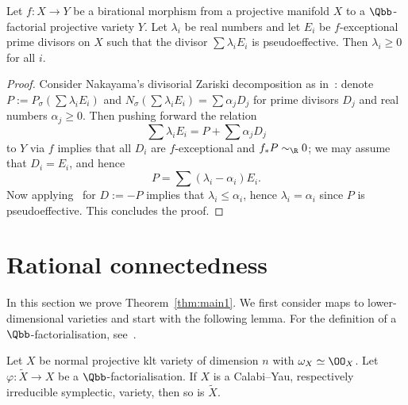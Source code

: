 \begin{lemm}\label{lem:exceptional}
Let $f\colon X\to Y$ be a birational morphism from a projective manifold $X$ to a $\Qbb$-factorial projective variety $Y$. Let $\lambda_i$ be real numbers and let $E_i$ be $f$-exceptional prime divisors on $X$ such that the divisor $\sum \lambda_i E_i$ is pseudoeffective. Then $\lambda_i\geq0$ for all $i$.
\end{lemm}

\begin{proof}
Consider Nakayama's divisorial Zariski decomposition as in~\cite[Chapter~III]{Nak04}: denote $P:=P_\sigma(\sum \lambda_i E_i)$ and $N_\sigma(\sum \lambda_i E_i)=\sum \alpha_j D_j$ for prime divisors $D_j$ and real numbers $\alpha_j\geq0$. Then pushing forward the relation
\[
\sum \lambda_i E_i=P+\sum \alpha_j D_j
\]
to $Y$ via $f$ implies that all $D_i$ are $f$-exceptional and $f_*P\sim_\R 0$; we may assume that $D_i=E_i$, and hence
\[
P=\sum(\lambda_i-\alpha_i)E_i.
\]
Now applying~\cite[Lemma~3.3]{Bir12} for $D:=-P$ implies that $\lambda_i\leq\alpha_i$, hence $\lambda_i=\alpha_i$ since $P$ is pseudoeffective. This concludes the proof.
\end{proof}

\section{Rational connectedness}\label{sec:ratconn}

In this section we prove Theorem~\ref{thm:main1}. We first consider maps to lower-dimensional varieties and start with the following lemma. For the definition of a $\Qbb$-factorialisation, see~\cite[Corollary~1.37]{Kol13}.

\begin{lemm}\label{lem:reduction}
Let $X$ be normal projective klt variety of dimension $n$ with $\omega_X \simeq \OO_X$. Let $\varphi\colon \widetilde X \to X$ be a $\Qbb$-factorialisation. If $X$ is a Calabi--Yau, respectively irreducible symplectic, variety, then so is $\widetilde X$.
\end{lemm}

